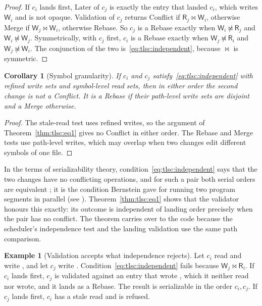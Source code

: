 \documentclass[11pt,letterpaper]{article}
\newtheorem{corollary}[theorem]{Corollary}
\theoremstyle{definition}
\newtheorem{example}[theorem]{Example}
\theoremstyle{remark}
\newcommand{\R}{\mathsf{R}}
\newcommand{\W}{\mathsf{W}}
\newcommand{\meets}{\bowtie}
\newcommand{\nmeets}{\not\bowtie}
\newcommand{\Later}{\mathrm{Later}}
\begin{document}
\begin{proof}
If $c_i$ lands first, $\Later$ of $c_j$ is exactly the entry that landed $c_i$, which writes $\W_i$ and is not opaque. Validation of $c_j$ returns Conflict if $\R_j\meets\W_i$, otherwise Merge if $\W_j\meets\W_i$, otherwise Rebase. So $c_j$ is a Rebase exactly when $\W_i\nmeets\R_j$ and $\W_i\nmeets\W_j$. Symmetrically, with $c_j$ first, $c_i$ is a Rebase exactly when $\W_j\nmeets\R_i$ and $\W_j\nmeets\W_i$. The conjunction of the two is~\eqref{eq:tlsc:independent}, because $\meets$ is symmetric.
\end{proof}

\begin{corollary}[Symbol granularity]
\label{cor:tlsc:symbols}
If $c_i$ and $c_j$ satisfy~\eqref{eq:tlsc:independent} with refined write sets and symbol-level read sets, then in either order the second change is not a Conflict. It is a Rebase if their path-level write sets are disjoint and a Merge otherwise.
\end{corollary}

\begin{proof}
The stale-read test uses refined writes, so the argument of Theorem~\ref{thm:tlsc:eq1} gives no Conflict in either order. The Rebase and Merge tests use path-level writes, which may overlap when two changes edit different symbols of one file.
\end{proof}

In the terms of serializability theory, condition~\eqref{eq:tlsc:independent} says that the two changes have no conflicting operations, and for such a pair both serial orders are equivalent \cite[Sections 2.1 and 2.2]{bhg1987}; it is the condition Bernstein gave for running two program segments in parallel (see \cite{bernstein1966}). Theorem~\ref{thm:tlsc:eq1} shows that the validator honours this exactly: its outcome is independent of landing order precisely when the pair has no conflict. The theorem carries over to the code because the scheduler's independence test and the landing validation use the same path comparison.

\begin{example}[Validation accepts what independence rejects]
\label{ex:tlsc:onesided}
Let $c_i$ read  and write , and let $c_j$ write . Condition~\eqref{eq:tlsc:independent} fails because $\W_j\meets\R_i$. If $c_i$ lands first, $c_j$ is validated against an entry that wrote , which it neither read nor wrote, and it lands as a Rebase. The result is serializable in the order $c_i,c_j$. If $c_j$ lands first, $c_i$ has a stale read and is refused.
\end{example}
\end{document}
